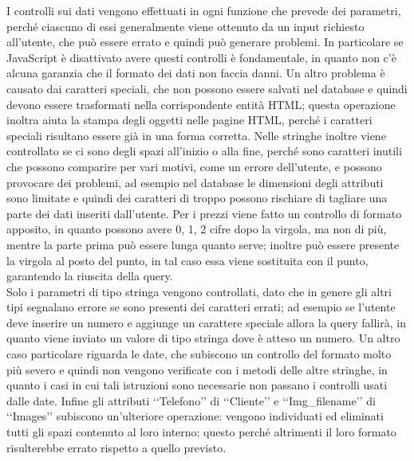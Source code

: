 {{		I controlli sui dati vengono effettuati in ogni funzione che prevede dei parametri, perché ciascuno di essi generalmente viene ottenuto da un input richiesto all'utente, che può essere errato e quindi può generare problemi. In particolare se JavaScript è disattivato avere questi controlli è fondamentale, in quanto non c'è alcuna garanzia che il formato dei dati non faccia danni. Un altro problema è causato dai caratteri speciali, che non possono essere salvati nel database e quindi devono essere trasformati nella corrispondente entità HTML; questa operazione inoltra aiuta la stampa degli oggetti nelle pagine HTML, perché i caratteri speciali risultano essere già in una forma corretta. Nelle stringhe inoltre viene controllato se ci sono degli spazi all'inizio o alla fine, perché sono caratteri inutili che possono comparire per vari motivi, come un errore dell'utente, e possono provocare dei problemi, ad esempio nel database le dimensioni degli attributi sono limitate e quindi dei caratteri di troppo possono rischiare di tagliare una parte dei dati inseriti dall'utente. Per i prezzi viene fatto un controllo di formato apposito, in quanto possono avere 0, 1, 2 cifre dopo la virgola, ma non di più, mentre la parte prima può essere lunga quanto serve; inoltre può essere presente la virgola al posto del punto, in tal caso essa viene sostituita con il punto, garantendo la riuscita della query.\\
		Solo i parametri di tipo stringa vengono controllati, dato che in genere gli altri tipi segnalano errore se sono presenti dei caratteri errati; ad esempio se l'utente deve inserire un numero e aggiunge un carattere speciale allora la query fallirà, in quanto viene inviato un valore di tipo stringa dove è atteso un numero. Un altro caso particolare riguarda le date, che subiscono un controllo del formato molto più severo e quindi non vengono verificate con i metodi delle altre stringhe, in quanto i casi in cui tali istruzioni sono necessarie non passano i controlli usati dalle date. Infine gli attributi ‘‘Telefono’’ di ‘‘Cliente’’ e ‘‘Img_filename’’ di ‘‘Images’’ subiscono un'ulteriore operazione: vengono individuati ed eliminati tutti gli spazi contenuto al loro interno; questo perché altrimenti il loro formato risulterebbe errato rispetto a quello previsto.
	}
}